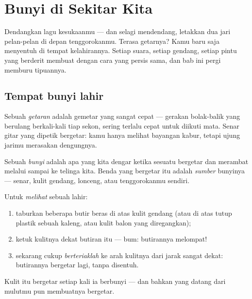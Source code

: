 \chapter{Bunyi di Sekitar Kita}\label{ch:g3:sound-around-us}

Dendangkan lagu kesukaanmu --- dan selagi mendendang, letakkan dua
jari pelan-pelan di depan tenggorokanmu. Terasa getarnya? Kamu baru
saja menyentuh  di tempat kelahirannya. Setiap suara, setiap
gendang, setiap pintu yang berderit membuat  dengan cara yang
persis sama, dan bab ini pergi memburu tipuannya.

\section{Tempat bunyi lahir}

\begin{definition}[Getaran]\label{def:g3:sound-around-us:vibration}
Sebuah \emph{getaran} adalah gemetar yang sangat cepat
--- gerakan bolak-balik yang berulang berkali-kali tiap sekon, sering
terlalu cepat untuk diikuti mata. Senar gitar yang dipetik bergetar:
kamu hanya melihat bayangan kabur, tetapi ujung jarimu merasakan
dengungnya.
\end{definition}

\begin{definition}[Bunyi]\label{def:g3:sound-around-us:sound}
Sebuah \emph{bunyi} adalah apa yang kita dengar ketika
sesuatu bergetar dan  merambat melalui  sampai ke
telinga kita. Benda yang bergetar itu adalah \emph{sumber} bunyinya
--- senar, kulit gendang, lonceng, atau tenggorokanmu sendiri.
\end{definition}

\begin{method}\label{met:g3:sound-around-us:rice}
Untuk \emph{melihat} sebuah  lahir:
\begin{enumerate}
  \item taburkan beberapa butir beras di atas kulit gendang (atau di
        atas tutup plastik sebuah kaleng, atau kulit balon yang
        diregangkan);
  \item ketuk kulitnya dekat butiran itu --- bum: butirannya
        melompat!
  \item sekarang cukup \emph{berteriaklah} ke arah kulitnya dari
        jarak sangat dekat: butirannya bergetar lagi, tanpa disentuh.
\end{enumerate}
Kulit itu bergetar setiap kali ia berbunyi --- dan bahkan  yang
datang dari mulutmu pun membuatnya bergetar.
\end{method}

